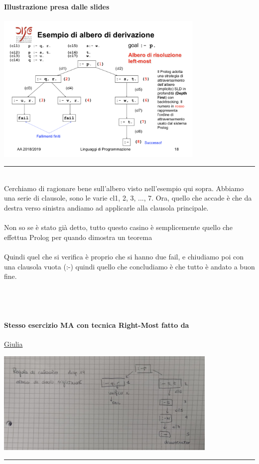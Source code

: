 \documentclass[12pt, a4paper, openany, oneside]{book}
\begin{document}
\paragraph{Illustrazione presa dalle slides}
\begin{center}
\includegraphics[width=0.75\textwidth]{alberoSLD}
\end{center}
{\color{black} \rule{\linewidth}{0.3mm} }
\\
Cerchiamo di ragionare bene sull'albero visto nell'esempio qui sopra. Abbiamo
una serie di clausole, sono le varie cl1, 2, 3, ..., 7. Ora, quello che accade
è che da destra verso sinistra andiamo ad applicarle alla clausola principale.
\\ \\
Non so se è stato già detto, tutto questo casino è semplicemente quello che 
effettua Prolog per quando dimostra un teorema \\ \\
Quindi quel che si verifica è proprio che si hanno due fail, e chiudiamo 
poi con una clausola vuota (:-) quindi quello che concludiamo è che tutto è 
andato a buon fine.
\\ \\ \\ \\
\paragraph{Stesso esercizio MA con tecnica Right-Most fatto da} 
\href{https://github.com/LiaBell47}{Giulia}
\begin{center}
\includegraphics[width=0.80\textwidth]{rightmost}
\end{center}
{\color{black} \rule{\linewidth}{0.3mm}}
\\
\end{document}
